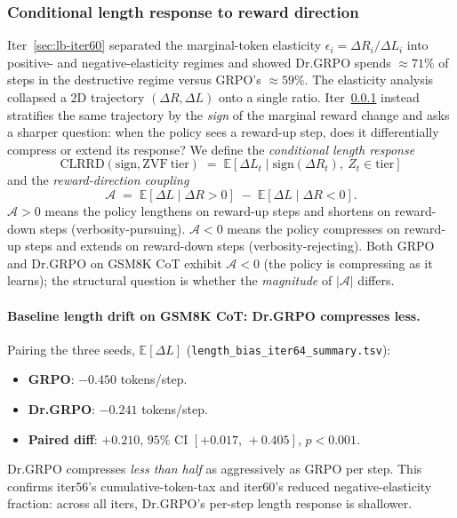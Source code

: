 
\subsubsection{Conditional length response to reward direction}\label{sec:lb-iter64}

Iter~\ref{sec:lb-iter60} separated the marginal-token elasticity
$\epsilon_i = \Delta R_i / \Delta L_i$ into positive- and negative-elasticity
regimes and showed Dr.GRPO spends $\approx 71\%$ of steps in the
destructive regime versus GRPO's $\approx 59\%$. The elasticity analysis
collapsed a 2D trajectory $(\Delta R, \Delta L)$ onto a single ratio.
Iter~\ref{sec:lb-iter64} instead stratifies the same trajectory by the
\emph{sign} of the marginal reward change and asks a sharper question:
when the policy sees a reward-up step, does it differentially compress
or extend its response? We define the \emph{conditional length response}
\begin{equation}\label{eq:lb64-clrrd}
\mathrm{CLRRD}(\mathrm{sign}, \mathrm{ZVF\ tier}) \;=\; \mathbb{E}\!\left[\Delta L_t \mid \mathrm{sign}(\Delta R_t),\ Z_t \in \mathrm{tier}\right]
\end{equation}
and the \emph{reward-direction coupling}
\begin{equation}\label{eq:lb64-alignment}
\mathcal{A} \;=\; \mathbb{E}[\Delta L \mid \Delta R > 0] \;-\; \mathbb{E}[\Delta L \mid \Delta R < 0].
\end{equation}
$\mathcal{A} > 0$ means the policy lengthens on reward-up steps and
shortens on reward-down steps (verbosity-pursuing).
$\mathcal{A} < 0$ means the policy compresses on reward-up steps and
extends on reward-down steps (verbosity-rejecting). Both GRPO and
Dr.GRPO on GSM8K CoT exhibit $\mathcal{A} < 0$ (the policy is
compressing as it learns); the structural question is whether the
\emph{magnitude} of $|\mathcal{A}|$ differs.

\paragraph{Baseline length drift on GSM8K CoT: Dr.GRPO compresses less.}
Pairing the three seeds, $\mathbb{E}[\Delta L]$
(\texttt{length\_bias\_iter64\_summary.tsv}):
\begin{itemize}
\item \textbf{GRPO}: $-0.450$ tokens/step.
\item \textbf{Dr.GRPO}: $-0.241$ tokens/step.
\item \textbf{Paired diff}: $+0.210$, $95\%$ CI $[+0.017,\, +0.405]$,
      $p < 0.001$.
\end{itemize}
Dr.GRPO compresses \emph{less than half} as aggressively as GRPO per
step. This confirms iter56's cumulative-token-tax and iter60's reduced
negative-elasticity fraction: across all iters, Dr.GRPO's per-step
length response is shallower.

